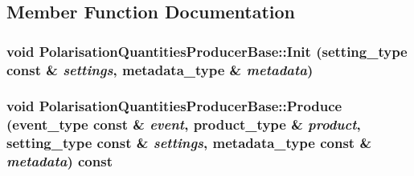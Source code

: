 \subsection{Member Function Documentation}
\hypertarget{classPolarisationQuantitiesProducerBase_ac27803aea612e48592db8b4a683b42da}{
\subsubsection[{Init}]{\setlength{\rightskip}{0pt plus 5cm}void PolarisationQuantitiesProducerBase::Init (setting\_\-type const \& {\em settings}, \/  metadata\_\-type \& {\em metadata})}}
\label{classPolarisationQuantitiesProducerBase_ac27803aea612e48592db8b4a683b42da}
\hypertarget{classPolarisationQuantitiesProducerBase_a6b3e115a3e937d4c9d79528d9e5e8a40}{
\subsubsection[{Produce}]{\setlength{\rightskip}{0pt plus 5cm}void PolarisationQuantitiesProducerBase::Produce (event\_\-type const \& {\em event}, \/  product\_\-type \& {\em product}, \/  setting\_\-type const \& {\em settings}, \/  metadata\_\-type const \& {\em metadata}) const}}
\label{classPolarisationQuantitiesProducerBase_a6b3e115a3e937d4c9d79528d9e5e8a40}



